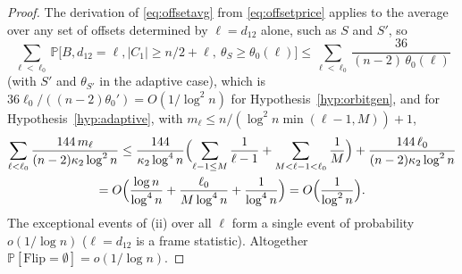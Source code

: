 \documentclass[11pt]{article}
\theoremstyle{definition}
\renewcommand{\Pr}{\mathbb{P}}
\begin{document}
\begin{proof}
The derivation of \eqref{eq:offsetavg} from \eqref{eq:offsetprice} applies to the average
over any set of offsets determined by $\ell=d_{12}$ alone, such as $S$ and $S'$, so
\[
\sum_{\ell<\ell_0}\Pr\bigl[B,d_{12}=\ell,|C_1|\ge n/2+\ell,\ \theta_{S}\ge\theta_0(\ell)\bigr]
\le\sum_{\ell<\ell_0}\frac{36}{(n-2)\,\theta_0(\ell)}
\]
(with $S'$ and $\theta_{S'}$ in the adaptive case), which is
$36\ell_0/((n-2)\theta_0')=O(1/\log^2n)$ for Hypothesis~\ref{hyp:orbitgen}, and
for Hypothesis~\ref{hyp:adaptive}, with $m_\ell\le n/(\log^2n\min(\ell-1,M))+1$,
\begin{multline*}
\sum_{\ell<\ell_0}\frac{144\,m_\ell}{(n-2)\kappa_2\log^2n}
\le\frac{144}{\kappa_2\log^4n}\Bigl(\sum_{\ell-1\le M}\frac1{\ell-1}+\sum_{M<\ell-1<\ell_0}\frac1M\Bigr)+\frac{144\,\ell_0}{(n-2)\kappa_2\log^2n}\\
=O\Bigl(\frac{\log n}{\log^4n}+\frac{\ell_0}{M\log^4n}+\frac1{\log^4n}\Bigr)=O\Bigl(\frac1{\log^2n}\Bigr).
\end{multline*}
The exceptional events of (ii) over all $\ell$ form a single event of probability
$o(1/\log n)$ ($\ell=d_{12}$ is a frame statistic).  Altogether
$\Pr[\mathrm{Flip}=\emptyset]=o(1/\log n)$.
\end{proof}
\end{document}
